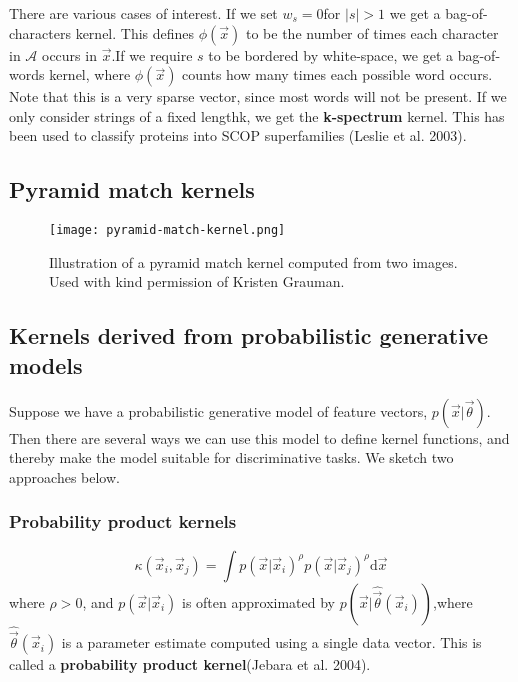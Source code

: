There are various cases of interest. If we set $w_s =0$for $|s| >1$ we get a bag-of-characters kernel. This defines $\phi(\vec{x})$ to be the number of times each character in $\mathcal{A}$ occurs in $\vec{x}$.If we require $s$ to be bordered by white-space, we get a bag-of-words kernel, where $\phi(\vec{x})$ counts how many times each possible word occurs. Note that this is a very sparse vector, since most words will not be present. If we only consider strings of a fixed lengthk, we get the \textbf{k-spectrum} kernel. This has been used to classify proteins into SCOP superfamilies (Leslie et al. 2003).


\subsection{Pyramid match kernels}
\begin{figure}[hbtp]
\centering
    \texttt{[image: pyramid-match-kernel.png]}
\caption{Illustration of a pyramid match kernel computed from two images. Used with kind permission of Kristen Grauman.}
\label{fig:pyramid-match-kernel}
\end{figure}


\subsection{Kernels derived from probabilistic generative models}
Suppose we have a probabilistic generative model of feature vectors, $p(\vec{x}|\vec{\theta})$. Then there are several ways we can use this model to define kernel functions, and thereby make the model suitable for discriminative tasks. We sketch two approaches below.


\subsubsection{Probability product kernels}
\begin{equation}\label{eqn:Probability-product-kernels}
\kappa(\vec{x}_i,\vec{x}_j)=\int p(\vec{x}|\vec{x}_i)^{\rho}p(\vec{x}|\vec{x}_j)^{\rho}\mathrm{d}\vec{x}
\end{equation}
where $\rho>0$, and $p(\vec{x}|\vec{x}_i)$ is often approximated by $p(\vec{x}|\hat{\vec{\theta}}(\vec{x}_i))$,where $\hat{\vec{\theta}}(\vec{x}_i)$ is a parameter estimate computed using a single data vector. This is called a \textbf{probability product kernel}(Jebara et al. 2004).

